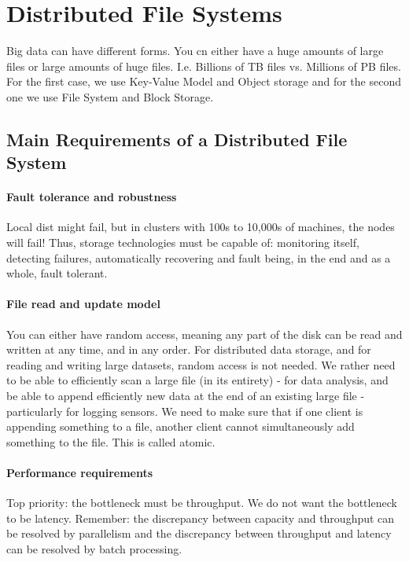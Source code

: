 \section{Distributed File Systems}

Big data can have different forms. You cn either have a huge amounts of large files or large amounts of huge files. I.e. Billions of TB files vs. Millions of PB files. For the first case, we use Key-Value Model and Object storage and for the second one we use File System and Block Storage.

\subsection{Main Requirements of a Distributed File System}

\paragraph{Fault tolerance and robustness} Local dist might fail, but in clusters with 100s to 10,000s of machines, the nodes will fail! Thus, storage technologies must be capable of: monitoring itself, detecting failures, automatically recovering and fault being, in the end and as a whole, fault tolerant.

\paragraph{File read and update model}
You can either have random access, meaning any part of the disk can be read and written at any time, and in any order. For distributed data storage, and for reading and writing large datasets, random access is not needed. We rather need to be able to efficiently scan a large file (in its entirety) - for data analysis, and be able to append efficiently new data at the end of an existing large file - particularly for logging sensors. We need to make sure that if one client is appending something to a file, another client cannot simultaneously add something to the file. This is called atomic.

\paragraph{Performance requirements}
Top priority: the bottleneck must be throughput. We do not want the bottleneck to be latency. Remember: the discrepancy between capacity and throughput can be resolved by parallelism and the discrepancy between throughput and latency can be resolved by batch processing.


